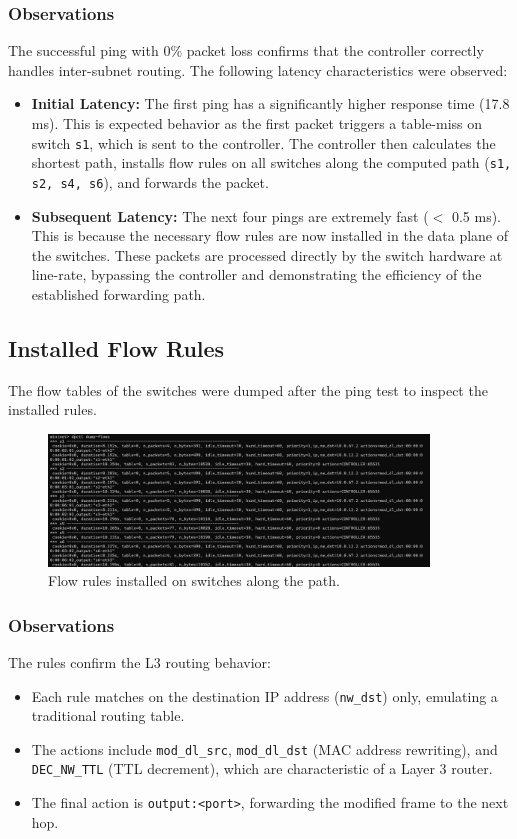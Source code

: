 \documentclass[12pt]{article}
\begin{document}
\subsubsection*{Observations}
The successful ping with 0\% packet loss confirms that the controller correctly handles inter-subnet routing. The following latency characteristics were observed:
\begin{itemize}
    \item \textbf{Initial Latency:} The first ping has a significantly higher response time (17.8 ms). This is expected behavior as the first packet triggers a table-miss on switch \texttt{s1}, which is sent to the controller. The controller then calculates the shortest path, installs flow rules on all switches along the computed path (\texttt{s1, s2, s4, s6}), and forwards the packet.
    
    \item \textbf{Subsequent Latency:} The next four pings are extremely fast ($<$ 0.5 ms). This is because the necessary flow rules are now installed in the data plane of the switches. These packets are processed directly by the switch hardware at line-rate, bypassing the controller and demonstrating the efficiency of the established forwarding path.
\end{itemize}

\subsection{Installed Flow Rules}
The flow tables of the switches were dumped after the ping test to inspect the installed rules.

\begin{figure}[h!]
    \centering
    \includegraphics[width=0.9\textwidth]{p3_rules.jpeg}
    \caption{Flow rules installed on switches along the path.}
\end{figure}

\subsubsection*{Observations}
The rules confirm the L3 routing behavior:
\begin{itemize}
    \item Each rule matches on the destination IP address (\texttt{nw\_dst}) only, emulating a traditional routing table.
    \item The actions include \texttt{mod\_dl\_src}, \texttt{mod\_dl\_dst} (MAC address rewriting), and \texttt{DEC\_NW\_TTL} (TTL decrement), which are characteristic of a Layer 3 router.
    \item The final action is \texttt{output:<port>}, forwarding the modified frame to the next hop.
\end{itemize}
\end{document}
